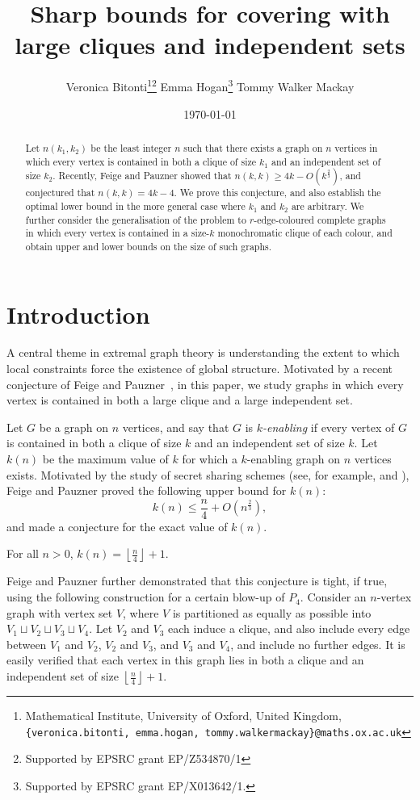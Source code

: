 \documentclass[12pt,a4paper]{article}
\title{Sharp bounds for covering with large cliques and independent sets}
\author{Veronica Bitonti\footnote{Mathematical Institute, University of Oxford, United Kingdom,\\ \texttt{\{veronica.bitonti, emma.hogan, tommy.walkermackay\}@maths.ox.ac.uk}}\protect\footnotemark[1] \footnote{Supported by EPSRC grant EP/Z534870/1} \qquad Emma Hogan\protect\footnotemark[1] \footnote{Supported by EPSRC grant EP/X013642/1.} \qquad Tommy Walker Mackay\protect\footnotemark[1]\qquad}
\date{\today}
\begin{document}
\maketitle

\begin{abstract}


Let $n(k_1, k_2)$ be the least integer $n$ such that there exists a graph on $n$ vertices in which every vertex is contained in both a clique of size $k_1$ and an independent set of size $k_2$. Recently, Feige and Pauzner showed that ${n(k, k) \geq 4k-O(k^\frac{2}{3})}$, and conjectured that $n(k,k)=4k-4$. We prove this conjecture, and also establish the optimal lower bound in the more general case where $k_1$ and $k_2$ are arbitrary. We further consider the generalisation of the problem to $r$-edge-coloured complete graphs in which every vertex is contained in a size-$k$ monochromatic clique of each colour, and obtain upper and lower bounds on the size of such graphs.
\end{abstract}

\section{Introduction}\label{sec:introduction}

A central theme in extremal graph theory is understanding the extent to which local constraints force the existence of global structure. Motivated by a recent conjecture of Feige and Pauzner~\cite{FP2025}, in this paper, we study graphs in which every vertex is contained in both a large clique and a large independent set.

Let $G$ be a graph on $n$ vertices, and say that $G$ is \emph{$k$-enabling} if every vertex of $G$ is contained in both a clique of size $k$ and an independent set of size $k$. Let $k(n)$ be the maximum value of $k$ for which a $k$-enabling graph on $n$ vertices exists. Motivated by the study of secret sharing schemes (see, for example, \cite{SCSS} and \cite{HTSAS}), Feige and Pauzner proved the following upper bound for $k(n)$:
\begin{equation*}
    k(n) \leq \frac{n}{4}+O\left(n^\frac{2}{3}\right),
\end{equation*}
and made a conjecture for the exact value of $k(n)$.
\begin{conjecture}\label{conj:feige_conjecture}
    For all $n > 0$, $k(n)=\left \lfloor{\frac{n}{4}}\right \rfloor+1$.
\end{conjecture}
Feige and Pauzner further demonstrated that this conjecture is tight, if true, using the following construction for a certain blow-up of $P_4$. Consider an $n$-vertex graph with vertex set $V$, where $V$ is partitioned as equally as possible into $V_1 \sqcup V_2 \sqcup V_3 \sqcup V_4$. Let $V_2$ and $V_3$ each induce a clique, and also include every edge between $V_1$ and $V_2$, $V_2$ and $V_3$, and $V_3$ and $V_4$, and include no further edges. It is easily verified that each vertex in this graph lies in both a clique and an independent set of size $\left \lfloor{\frac{n}{4}}\right \rfloor+1$.
\end{document}
